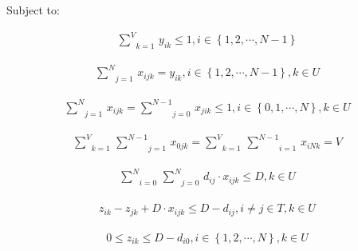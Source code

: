 \documentclass[lettersize,journal]{IEEEtran}
\begin{document}
	Subject to:
	
	\begin{small}
		\begin{equation}\label{constraint1}
			\begin{array}{cc}
				\underset{k=1}{\overset{V}{\mathop \sum }}\,{{y}_{ik}}\le \text{1},i\in \left\{ \text{1},\text{2},\cdots ,N-1 \right\}
			\end{array}
		\end{equation}
		
		\begin{equation}\label{constraint2}
			\begin{array}{cc}
				\underset{j=1}{\overset{N}{\mathop \sum }}\,{{x}_{ijk}}={{y}_{ik}},i\in \left\{ 1,2,\cdots ,N-1 \right\},k\in U
			\end{array}
		\end{equation}
		
		\begin{equation}\label{constraint3}
			\begin{array}{cc}
				\underset{j=1}{\overset{N}{\mathop \sum }}\,{{x}_{ijk}}=\underset{j=0}{\overset{N-1}{\mathop \sum }}\,{{x}_{jik}}\le \text{1},i\in \left\{ \text{0},\text{1},\cdots ,N \right\},k\in U
			\end{array}
		\end{equation}
		
		\begin{equation}\label{constraint4}
			\begin{array}{cc}
				\underset{k=1}{\overset{V}{\mathop \sum }}\,\underset{j=1}{\overset{N-1}{\mathop \sum }}\,{{x}_{0jk}}=\underset{k=1}{\overset{V}{\mathop \sum }}\,\underset{i=1}{\overset{N-1}{\mathop \sum }}\,{{x}_{iNk}}=V
			\end{array}
		\end{equation}
		
		\begin{equation}\label{constraint5}
			\begin{array}{cc}
				\underset{i=0}{\overset{N}{\mathop \sum }}\,\underset{j=0}{\overset{N}{\mathop \sum }}\,{{d}_{ij}}\cdot {{x}_{ijk}} \le D,k\in U
			\end{array}
		\end{equation}
		
		\begin{equation}\label{constraint6}
			\begin{array}{cc}
				{{z}_{ik}}-{{z}_{jk}}+D\cdot {{x}_{ijk}} \le D-{{d}_{ij}},i\ne j\in T,k\in U
			\end{array}
		\end{equation}
		
		\begin{equation}\label{constraint7}
			\begin{array}{cc}
				0 \le {{z}_{ik}} \le D-{{d}_{i0}},i\in \left\{ 1,2,\cdots ,N \right\},k\in U
			\end{array}
		\end{equation}
	\end{small}
\end{document}
